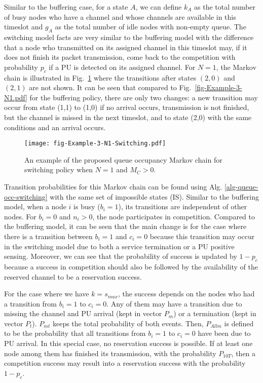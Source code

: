 \documentclass[12pt,journal,oneside,onecolumn]{IEEEtran}
\begin{document}
Similar to the buffering case, for a state $A$, we can define $k_A$ as the 
total number of busy nodes who have a channel and whose channels 
are available in this timeslot and $g_A$ as the total number of idle nodes with non-empty queue. 
The switching model facts are very similar to the buffering model with the difference 
that a node who transmitted on its assigned channel
in this timeslot may, if it does not finish its packet transmission,
 come back to the competition with probability $p_c$ if a PU is detected on its assigned channel.
For $N=1$, the Markov chain is illustrated in Fig.~\ref{fig-Example-3-N1-Switching.pdf} 
where the transitions after states $(2,0)$ and $(2,1)$ are not shown. 
It can be seen that compared to Fig.~\ref{fig-Example-3-N1.pdf} for the buffering policy, 
there are only two changes: a new transition may occur from state (1,1) to (1,0) 
if no arrival occurs, transmission is not finished, but the channel is missed in the next timeslot, 
and to state (2,0) with the same conditions and an arrival occurs.
\begin{figure}\texttt{[image: fig-Example-3-N1-Switching.pdf]}\caption{An example of the proposed queue occupancy Markov chain for switching policy when $N=1$ and $M_C>0$.}\label{fig-Example-3-N1-Switching.pdf}\end{figure}

Transition probabilities for this Markov chain can be found 
using Alg. \ref{alg-queue-occ-switching} with the same set of impossible states (IS). 
Similar to the buffering model, when a node $i$ is busy ($b_i=1$), 
its transitions are independent of other nodes. For $b_i=0$ and $n_i>0$, 
the node participates in competition. 
Compared to the buffering model, it can be seen that 
the main change is for the case where there is a transition between $b_i=1$ and $c_i=0$ 
because this transition may occur in the switching model due to both a service termination 
or a PU positive sensing. Moreover, we can see that the probability 
of success is updated by $1-p_c$ because a success in competition 
should also be followed by the availability of the reserved channel to be a reservation success.

For the case where we have $k=s_{max}$, the success depends on
the nodes who had a transition from $b_i=1$ to $c_i=0$.
Any of them may have a transition due to missing the channel and PU arrival (kept in vector $P_{m}$) 
or a termination (kept in vector $P_{t}$). 
$P_{mt}$ keeps the total probability of both events. Then, $P_{Allm}$  
is defined to be the probability that all transitions from $b_i=1$ 
to $c_i=0$ have been due to PU arrival. In this special case, 
no reservation success is possible. If at least one node among 
them has finished its transmission, with the probability $P_{10T}$, 
then a competition success may result into a reservation success with the probability $1-p_c$.
\end{document}
